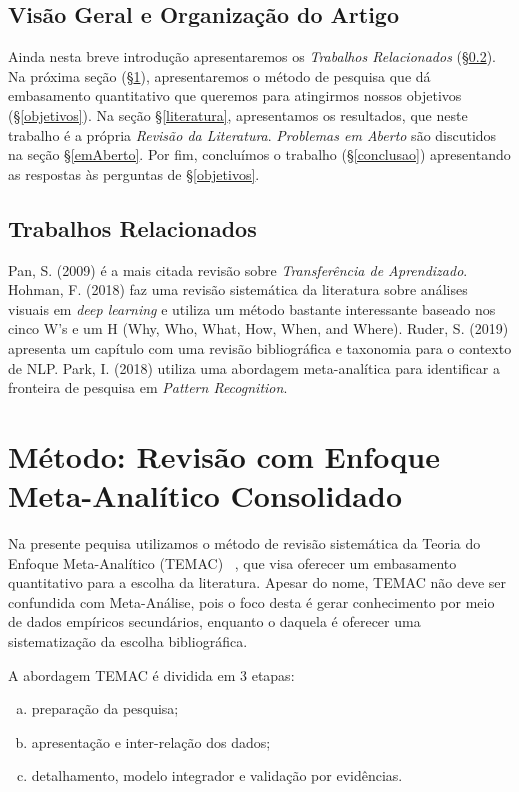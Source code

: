 \documentclass[sigconf]{acmart}
\begin{document}
  \subsection{Visão Geral e Organização do Artigo}
  Ainda nesta breve introdução apresentaremos os \emph{Trabalhos Relacionados} (\S\ref{related}). Na próxima seção (\S\ref{TEMAC}), apresentaremos o método de pesquisa que dá embasamento quantitativo que queremos para atingirmos nossos objetivos (\S\ref{objetivos}). Na seção \S\ref{literatura}, apresentamos os resultados, que neste trabalho é a própria  \emph{Revisão da Literatura}. \emph{Problemas em Aberto} são discutidos na seção \S\ref{emAberto}. Por fim, concluímos o trabalho (\S\ref{conclusao}) apresentando as respostas às perguntas de \S\ref{objetivos}.
  

  \subsection{Trabalhos Relacionados}\label{related}
  Pan, S. (2009)\cite{PanYang} é a mais citada revisão sobre \emph{Transferência de Aprendizado}. Hohman, F. (2018) faz uma revisão sistemática da literatura sobre análises visuais em \emph{deep learning} e utiliza um método bastante interessante baseado nos cinco W's e um H (Why, Who, What, How, When, and Where). Ruder, S. (2019) \cite{Ruder2019Neural} apresenta um capítulo com uma revisão bibliográfica e taxonomia para o contexto de NLP. Park, I. (2018) utiliza uma abordagem meta-analítica para identificar a fronteira de pesquisa em \emph{Pattern Recognition}.
\section{Método: Revisão com Enfoque Meta-Analítico Consolidado}\label{TEMAC}
Na presente pequisa utilizamos o método de revisão sistemática da Teoria do Enfoque Meta-Analítico (TEMAC) ~\cite{Mariano}, que visa oferecer um embasamento quantitativo para a escolha da literatura. Apesar do nome, TEMAC não deve ser confundida com Meta-Análise, pois o foco desta é gerar conhecimento por meio de dados empíricos secundários, enquanto o daquela é oferecer uma sistematização da escolha bibliográfica.

A abordagem TEMAC é dividida em 3 etapas: 
\begin{enumerate}[a)]
  \item preparação da pesquisa;
  \item apresentação e inter-relação dos dados;
  \item detalhamento, modelo integrador e validação por evidências.
\end{enumerate}
\end{document}
